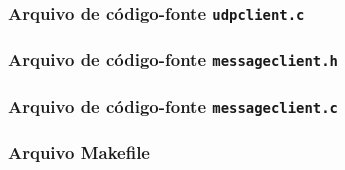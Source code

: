 \documentclass[12pt]{article}
\begin{document}
\subsubsection{Arquivo de código-fonte \texttt{udpclient.c}}



\subsubsection{Arquivo de código-fonte \texttt{messageclient.h}}



\subsubsection{Arquivo de código-fonte \texttt{messageclient.c}}



\subsubsection{Arquivo Makefile}




\newpage


\end{document}
